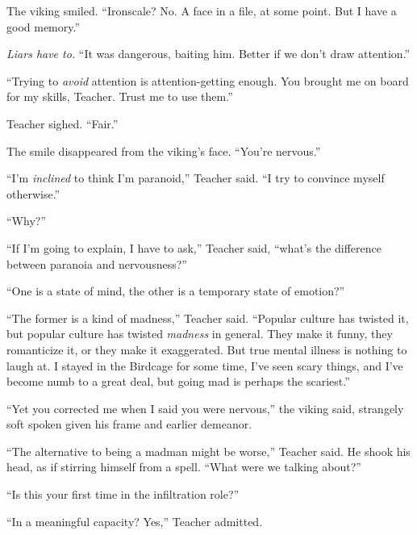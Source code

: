 The viking smiled.  ``Ironscale?  No.  A face in a file, at some point.  But I have a good memory.''



\emph{Liars have to.}  ``It was dangerous, baiting him.  Better if we don't draw attention.''



``Trying to \emph{avoid} attention is attention-getting enough.  You brought me on board for my skills, Teacher.  Trust me to use them.''



Teacher sighed.  ``Fair.''



The smile disappeared from the viking's face.  ``You're nervous.''



``I'm \emph{inclined} to think I'm paranoid,'' Teacher said.  ``I try to convince myself otherwise.''



``Why?''



``If I'm going to explain, I have to ask,'' Teacher said, ``what's the difference between paranoia and nervousness?''



``One is a state of mind, the other is a temporary state of emotion?''



``The former is a kind of madness,'' Teacher said.  ``Popular culture has twisted it, but popular culture has twisted \emph{madness} in general.  They make it funny, they romanticize it, or they make it exaggerated.  But true mental illness is nothing to laugh at.  I stayed in the Birdcage for some time, I've seen scary things, and I've become numb to a great deal, but going mad is perhaps the scariest.''



``Yet you corrected me when I said you were nervous,'' the viking said, strangely soft spoken given his frame and earlier demeanor.



``The alternative to being a madman might be worse,'' Teacher said.  He shook his head, as if stirring himself from a spell.  ``What were we talking about?''



``Is this your first time in the infiltration role?''



``In a meaningful capacity?  Yes,'' Teacher admitted.



